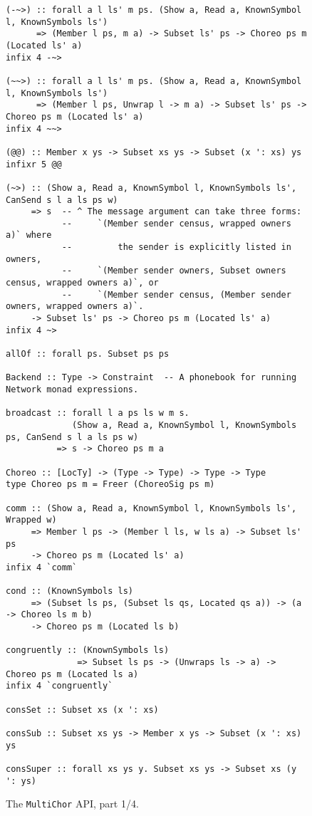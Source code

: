 \documentclass[sigplan,screen,review,anonymous]{acmart}
\newcommand{\MultiChor}{\texttt{Multi\-Chor}\xspace}
\begin{document}
\begin{figure*}
\begin{mdframed}
\begin{verbatim}
(-~>) :: forall a l ls' m ps. (Show a, Read a, KnownSymbol l, KnownSymbols ls')
      => (Member l ps, m a) -> Subset ls' ps -> Choreo ps m (Located ls' a)
infix 4 -~>

(~~>) :: forall a l ls' m ps. (Show a, Read a, KnownSymbol l, KnownSymbols ls')
      => (Member l ps, Unwrap l -> m a) -> Subset ls' ps -> Choreo ps m (Located ls' a)
infix 4 ~~>

(@@) :: Member x ys -> Subset xs ys -> Subset (x ': xs) ys
infixr 5 @@

(~>) :: (Show a, Read a, KnownSymbol l, KnownSymbols ls', CanSend s l a ls ps w)
     => s  -- ^ The message argument can take three forms:
           --     `(Member sender census, wrapped owners a)` where
           --         the sender is explicitly listed in owners,
           --     `(Member sender owners, Subset owners census, wrapped owners a)`, or
           --     `(Member sender census, (Member sender owners, wrapped owners a)`.
     -> Subset ls' ps -> Choreo ps m (Located ls' a)
infix 4 ~>

allOf :: forall ps. Subset ps ps

Backend :: Type -> Constraint  -- A phonebook for running Network monad expressions.

broadcast :: forall l a ps ls w m s.
             (Show a, Read a, KnownSymbol l, KnownSymbols ps, CanSend s l a ls ps w)
          => s -> Choreo ps m a

Choreo :: [LocTy] -> (Type -> Type) -> Type -> Type
type Choreo ps m = Freer (ChoreoSig ps m)

comm :: (Show a, Read a, KnownSymbol l, KnownSymbols ls', Wrapped w)
     => Member l ps -> (Member l ls, w ls a) -> Subset ls' ps
     -> Choreo ps m (Located ls' a)
infix 4 `comm`

cond :: (KnownSymbols ls)
     => (Subset ls ps, (Subset ls qs, Located qs a)) -> (a -> Choreo ls m b)
     -> Choreo ps m (Located ls b)

congruently :: (KnownSymbols ls)
              => Subset ls ps -> (Unwraps ls -> a) -> Choreo ps m (Located ls a)
infix 4 `congruently`

consSet :: Subset xs (x ': xs)

consSub :: Subset xs ys -> Member x ys -> Subset (x ': xs) ys

consSuper :: forall xs ys y. Subset xs ys -> Subset xs (y ': ys)
\end{verbatim}
\caption{The \MultiChor API, part 1/4.}
\label{fig:other-api}
\end{mdframed}
\end{figure*}
\end{document}
